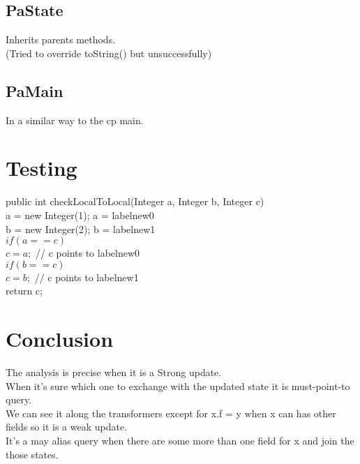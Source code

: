 \documentclass{article}
\begin{document}
\subsection{PaState}
Inherits parents methods.\\
(Tried to override toString() but unsuccessfully)

\subsection{PaMain} In a similar way to the cp main.

\section{Testing}
	public int checkLocalToLocal(Integer a, Integer b, Integer c)\\
	
    a = new Integer(1);     a = labelnew0\\
        
		b = new Integer(2);        b = labelnew1\\
		
		$if(a == c)$\\
		
			
			$c = a;$                    // c points to     labelnew0\\
		
		    $if(b == c)$\\
		
		
			$c = b;	   $         // c points to labelnew1\\
			
		return c;

\section{Conclusion}
 The analysis is precise when it is a Strong update.\\ When it's sure which one to exchange with the updated state it is  must-point-to query.\\ We can see it along the transformers except for x.f = y when x can has other fields so it is a weak update.\\ It's a may alias query when there are some more than one field for x and join the those states.
 
 
\end{document}
